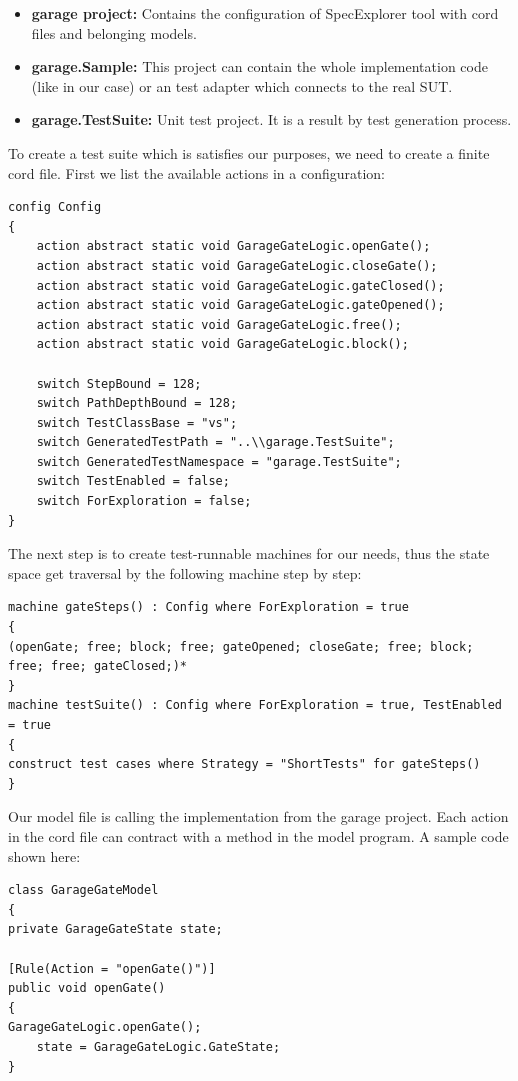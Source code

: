 \begin{itemize}
	\item \textbf{garage project:} Contains the configuration of SpecExplorer tool with cord files and belonging models.
	\item \textbf{garage.Sample:} This project can contain the whole implementation code (like in our case) or an test adapter which connects to the real SUT.
	\item \textbf{garage.TestSuite:} Unit test project. It is a result by test generation process.
\end{itemize}

To create a test suite which is satisfies our purposes, we need to create a finite cord file. 
First we list the available actions in a configuration:
\begin{lstlisting}
config Config 
{
	action abstract static void GarageGateLogic.openGate();
	action abstract static void GarageGateLogic.closeGate();
	action abstract static void GarageGateLogic.gateClosed();
	action abstract static void GarageGateLogic.gateOpened();
	action abstract static void GarageGateLogic.free();
	action abstract static void GarageGateLogic.block();
	
	switch StepBound = 128;
	switch PathDepthBound = 128;
	switch TestClassBase = "vs";
	switch GeneratedTestPath = "..\\garage.TestSuite";
	switch GeneratedTestNamespace = "garage.TestSuite";
	switch TestEnabled = false;
	switch ForExploration = false;
}
\end{lstlisting}

The next step is to create test-runnable machines for our needs, thus the state space get traversal by the following machine step by step:
\begin{lstlisting}
machine gateSteps() : Config where ForExploration = true
{
(openGate; free; block; free; gateOpened; closeGate; free; block; free; free; gateClosed;)*
}
machine testSuite() : Config where ForExploration = true, TestEnabled = true
{
construct test cases where Strategy = "ShortTests" for gateSteps() 
}
\end{lstlisting}


\begin{minipage}{\linewidth}
Our model file is calling the implementation from the garage project. Each action in the cord file can contract with a method in the model program. A sample code shown here:
\begin{lstlisting}
class GarageGateModel
{
private GarageGateState state;

[Rule(Action = "openGate()")]
public void openGate()
{
GarageGateLogic.openGate();
	state = GarageGateLogic.GateState;
}
\end{lstlisting}
\end{minipage}

